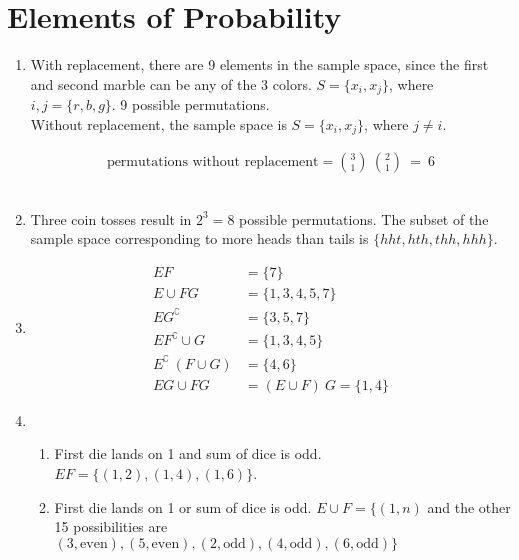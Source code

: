 \chapter{Elements of Probability}

\begin{enumerate}
	\item With replacement, there are 9 elements in the sample space, since the first and second marble can be any of the 3 colors. $ S = \{ x_i, x_j \} $, where $ i, j = \{ r, b, g \} $. 9 possible permutations. \\
	
	Without replacement, the sample space is $ S = \{ x_i, x_j \} $, where $ j \neq i $.
	
	\begin{align}
		\text{permutations without replacement} =  \binom{3}{1} \ \binom{2}{1} \ = \ 6
	\end{align} \\
	
	\item Three coin tosses result in $ 2^3  = 8$ possible permutations. The subset of the sample space corresponding to more heads than tails is $ \{ hht, hth, thh, hhh \} $. \\
	
	\item 	
		\begin{align}
			E F &= \{ 7 \} \\
			E \cup FG &= \{ 1, 3, 4, 5, 7 \} \\
			E G^\complement &= \{ 3, 5, 7 \} \\
			E F^\complement \cup G &= \{ 1, 3, 4, 5 \} \\
			E^\complement \  ( F \cup G ) &= \{ 4, 6 \} \\
			EG \cup FG &= (E \cup F) \ G = \{ 1, 4 \}
		\end{align}	
	
	
	\item \begin{enumerate}
		\item First die lands on 1 and sum of dice is odd. $ EF  = \{ (1,2), (1,4), (1,6) \}$. \\
		
		\item First die lands on 1 or sum of dice is odd. $ E \cup F = \{ (1, n) $ and the other 15 possibilities are $ (3, \text{even}), (5, \text{even}), (2, \text{odd}), (4, \text{odd}), (6, \text{odd}) \} $ \\
		

\end{enumerate}
\end{enumerate}
